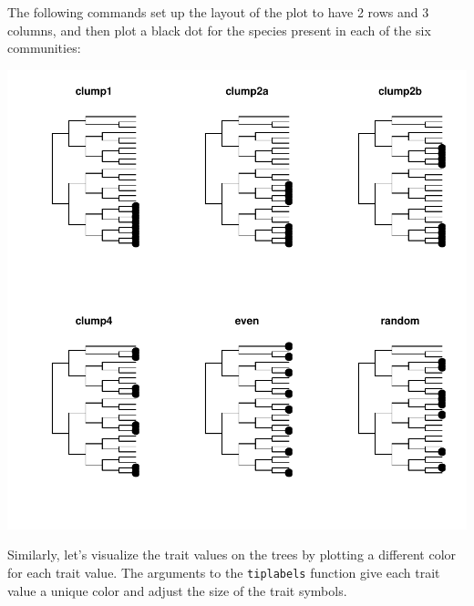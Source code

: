\documentclass[12pt]{article}
\begin{document}
The following commands set up the layout of the plot to have 2 rows and 3 columns, and then plot a black dot for the species present in each of the six communities:

\begin{Schunk}
\end{Schunk}
\includegraphics{picante-intro-007}

Similarly, let's visualize the trait values on the trees by plotting a different color for each trait value. The arguments to the \texttt{tiplabels} function give each trait value a unique color and adjust the size of the trait symbols.
\end{document}
